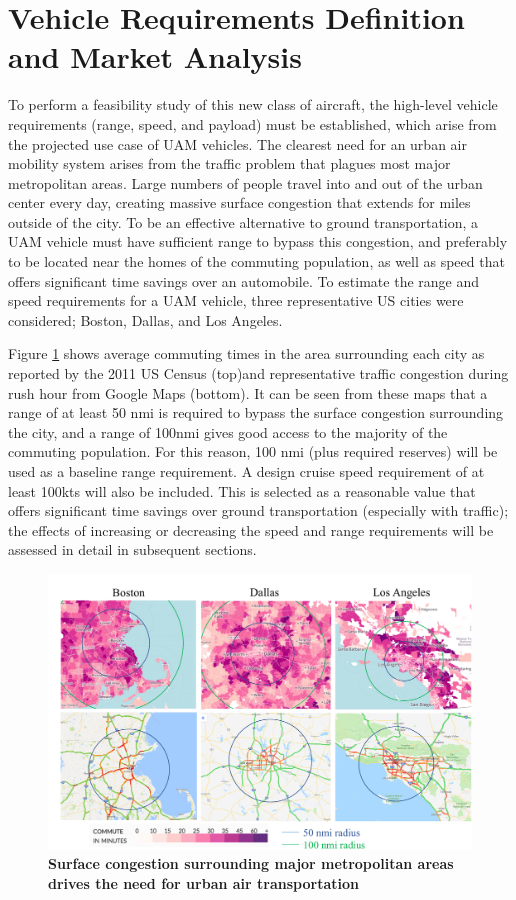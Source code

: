 \documentclass[]{aiaa-tc}%
\begin{document}
\section{Vehicle Requirements Definition and Market Analysis}
To perform a feasibility study of this new class of aircraft, the high-level vehicle requirements (range, speed, and payload) must be established, which arise from the projected use case of UAM vehicles.  The clearest need for an urban air mobility system arises from the traffic problem that plagues most major metropolitan areas.  Large numbers of people travel into and out of the urban center every day, creating massive surface congestion that extends for miles outside of the city.  To be an effective alternative to ground transportation, a UAM vehicle must have sufficient range to bypass this congestion, and preferably to be located near the homes of the commuting population, as well as speed that offers significant time savings over an automobile.  
To estimate the range and speed requirements for a UAM vehicle, three representative US cities were considered; Boston, Dallas, and Los Angeles.  

Figure \ref{f:commute} shows average commuting times in the area surrounding each city as reported by the 2011 US Census (top)\cite{WNYC}and representative traffic congestion during rush hour from Google Maps (bottom)\cite{GMaps}.   It can be seen from these maps that a range of at least 50 nmi is required to bypass the surface congestion surrounding the city, and a range of 100nmi gives good access to the majority of the commuting population.   For this reason, 100 nmi (plus required reserves) will be used as a baseline range requirement.  A design cruise speed requirement of at least 100kts will also be included.  This is selected as a reasonable value that offers significant time savings over ground transportation (especially with traffic); the effects of increasing or decreasing the speed and range requirements will be assessed in detail in subsequent sections.  

\begin{figure}[h!]
	\begin{center}
	\includegraphics[width=1.0\textwidth]{commuting_need.pdf}
    \caption{\textbf{Surface congestion surrounding major metropolitan areas drives the need for urban air transportation}}
	\label{f:commute}
	\end{center}
\end{figure}
\end{document}
